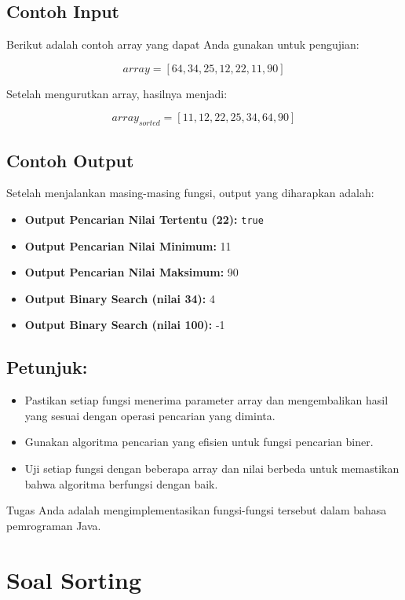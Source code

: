 \subsection{Contoh Input}

Berikut adalah contoh array yang dapat Anda gunakan untuk pengujian:

\[
array = [64, 34, 25, 12, 22, 11, 90]
\]

Setelah mengurutkan array, hasilnya menjadi:

\[
array_{sorted} = [11, 12, 22, 25, 34, 64, 90]
\]

\subsection{Contoh Output}

Setelah menjalankan masing-masing fungsi, output yang diharapkan adalah:

\begin{itemize}
	\item \textbf{Output Pencarian Nilai Tertentu (22):} \texttt{true}
	\item \textbf{Output Pencarian Nilai Minimum:} 11
	\item \textbf{Output Pencarian Nilai Maksimum:} 90
	\item \textbf{Output Binary Search (nilai 34):} 4
	\item \textbf{Output Binary Search (nilai 100):} -1
\end{itemize}

\subsection{Petunjuk:}

\begin{itemize}
	\item Pastikan setiap fungsi menerima parameter array dan mengembalikan hasil yang sesuai dengan operasi pencarian yang diminta.
	\item Gunakan algoritma pencarian yang efisien untuk fungsi pencarian biner.
	\item Uji setiap fungsi dengan beberapa array dan nilai berbeda untuk memastikan bahwa algoritma berfungsi dengan baik.
\end{itemize}

Tugas Anda adalah mengimplementasikan fungsi-fungsi tersebut dalam bahasa pemrograman Java.


\section{Soal Sorting}

